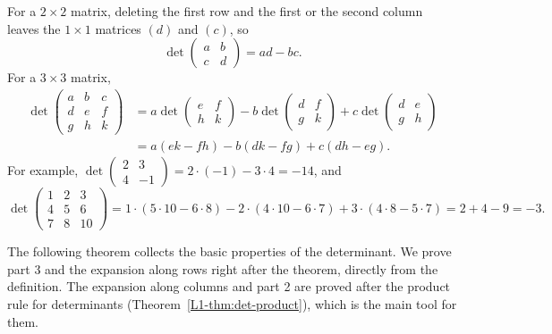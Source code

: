 \begin{example}
    For a $2 \times 2$ matrix, deleting the first row and the first or the second column leaves the $1 \times 1$ matrices $(d)$ and $(c)$, so
    \[\det \begin{pmatrix}
        a & b \\
        c & d
    \end{pmatrix} = ad - bc.\]
    For a $3 \times 3$ matrix,
    \begin{align*}
        \det \begin{pmatrix}
            a & b & c \\
            d & e & f \\
            g & h & k
        \end{pmatrix} &= a \det \begin{pmatrix}
            e & f \\
            h & k
        \end{pmatrix} - b \det \begin{pmatrix}
            d & f \\
            g & k
        \end{pmatrix} + c \det \begin{pmatrix}
            d & e \\
            g & h
        \end{pmatrix} \\
        &= a(ek - fh) - b(dk - fg) + c(dh - eg).
    \end{align*}
    For example, $\det \begin{pmatrix} 2 & 3 \\ 4 & -1 \end{pmatrix} = 2 \cdot (-1) - 3 \cdot 4 = -14$, and
    \[\det \begin{pmatrix}
        1 & 2 & 3 \\
        4 & 5 & 6 \\
        7 & 8 & 10
    \end{pmatrix} = 1 \cdot (5 \cdot 10 - 6 \cdot 8) - 2 \cdot (4 \cdot 10 - 6 \cdot 7) + 3 \cdot (4 \cdot 8 - 5 \cdot 7) = 2 + 4 - 9 = -3.\]
\end{example}

The following theorem collects the basic properties of the determinant. We prove part 3 and the expansion along rows right after the theorem, directly from the definition. The expansion along columns and part 2 are proved after the product rule for determinants (Theorem~\ref{L1-thm:det-product}), which is the main tool for them.

